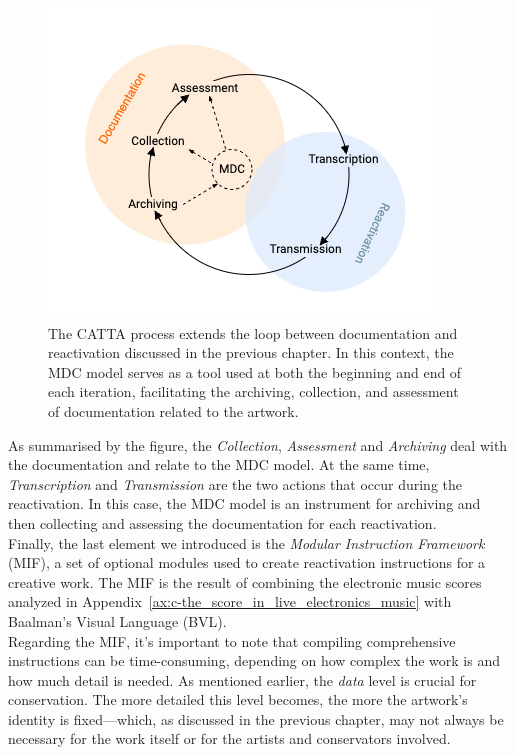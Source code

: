 \begin{figure}[!h]
    \centering
    \includegraphics[width=0.8\linewidth]{chapters/3-mdc_model-reactivation_workflow-instruction_template/image/graph03-mdc-catta.png}
    \caption{The CATTA process extends the loop between documentation and reactivation discussed in the previous chapter. In this context, the MDC model serves as a tool used at both the beginning and end of each iteration, facilitating the archiving, collection, and assessment of documentation related to the artwork.}
    \label{fig:c3-mdc-catta}
\end{figure}

As summarised by the figure, the \textit{Collection}, \textit{Assessment} and \textit{Archiving} deal with the documentation and relate to the MDC model. At the same time, \textit{Transcription} and \textit{Transmission} are the two actions that occur during the reactivation. In this case, the MDC model is an instrument for archiving and then collecting and assessing the documentation for each reactivation.\\
Finally, the last element we introduced is the \textit{Modular Instruction Framework} (MIF), a set of optional modules used to create reactivation instructions for a creative work. The MIF is the result of combining the electronic music scores analyzed in Appendix~\ref{ax:c-the_score_in_live_electronics_music} with Baalman’s Visual Language (BVL).\\
Regarding the MIF, it’s important to note that compiling comprehensive instructions can be time-consuming, depending on how complex the work is and how much detail is needed. As mentioned earlier, the \textit{data} level is crucial for conservation. The more detailed this level becomes, the more the artwork’s identity is fixed—which, as discussed in the previous chapter, may not always be necessary for the work itself or for the artists and conservators involved.


